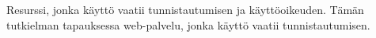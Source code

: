 Resurssi, jonka käyttö vaatii tunnistautumisen ja käyttöoikeuden. Tämän tutkielman tapauksessa web-palvelu, jonka käyttö vaatii tunnistautumisen.